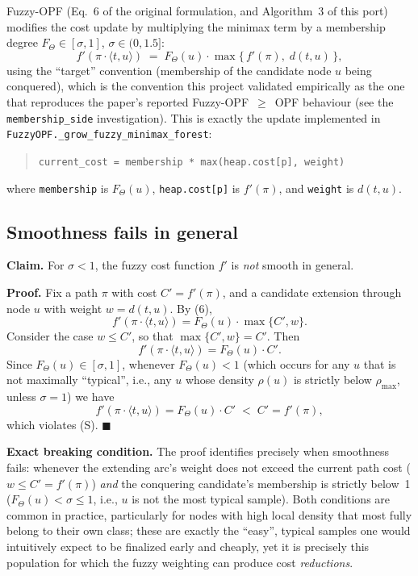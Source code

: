 Fuzzy-OPF (Eq.~6 of the original formulation, and Algorithm~3 of this port) modifies the cost update by multiplying the minimax term by a membership degree $F_\Theta \in [\sigma, 1]$, $\sigma \in (0, 1.5]$:
\[
f'(\pi \cdot \langle t, u \rangle) \;=\; F_\Theta(u) \cdot \max\{\, f'(\pi),\; d(t,u) \,\}, \tag{6}
\]
using the ``target'' convention (membership of the candidate node $u$ being conquered), which is the convention this project validated empirically as the one that reproduces the paper's reported Fuzzy-OPF~$\ge$~OPF behaviour (see the \texttt{membership\_side} investigation). This is exactly the update implemented in \texttt{FuzzyOPF.\_grow\_fuzzy\_minimax\_forest}:
\begin{quote}
\texttt{current\_cost = membership * max(heap.cost[p], weight)}
\end{quote}
where \texttt{membership} is $F_\Theta(u)$, \texttt{heap.cost[p]} is $f'(\pi)$, and \texttt{weight} is $d(t,u)$.

\subsection{Smoothness fails in general}

\textbf{Claim.} For $\sigma < 1$, the fuzzy cost function $f'$ is \emph{not} smooth in general.

\textbf{Proof.} Fix a path $\pi$ with cost $C' = f'(\pi)$, and a candidate extension through node $u$ with weight $w = d(t,u)$. By (6),
\[
f'(\pi \cdot \langle t,u \rangle) = F_\Theta(u) \cdot \max\{C', w\}.
\]
Consider the case $w \le C'$, so that $\max\{C', w\} = C'$. Then
\[
f'(\pi \cdot \langle t,u \rangle) = F_\Theta(u) \cdot C'.
\]
Since $F_\Theta(u) \in [\sigma, 1]$, whenever $F_\Theta(u) < 1$ (which occurs for any $u$ that is not maximally ``typical'', i.e., any $u$ whose density $\rho(u)$ is strictly below $\rho_{\max}$, unless $\sigma = 1$) we have
\[
f'(\pi \cdot \langle t,u \rangle) = F_\Theta(u) \cdot C' \;<\; C' = f'(\pi),
\]
which violates (S). $\blacksquare$

\textbf{Exact breaking condition.} The proof identifies precisely when smoothness fails: whenever the extending arc's weight does not exceed the current path cost ($w \le C' = f'(\pi)$) \emph{and} the conquering candidate's membership is strictly below~1 ($F_\Theta(u) < \sigma \le 1$, i.e., $u$ is not the most typical sample). Both conditions are common in practice, particularly for nodes with high local density that most fully belong to their own class; these are exactly the ``easy'', typical samples one would intuitively expect to be finalized early and cheaply, yet it is precisely this population for which the fuzzy weighting can produce cost \emph{reductions}.

